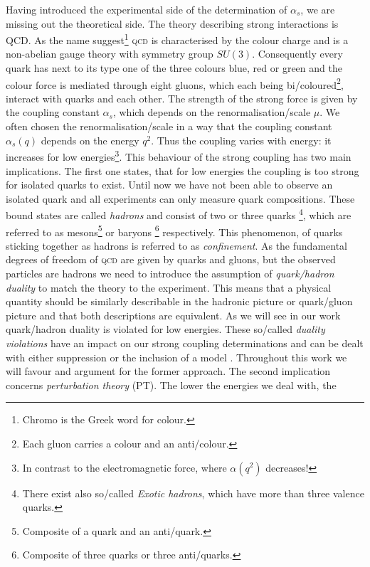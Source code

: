 \documentclass[../../index.tex]{subfiles}
\begin{document}
Having introduced the experimental side of the determination of $\alpha_s$, we
are missing out the theoretical side. The theory describing strong interactions
is \textsc{QCD}. As the name suggest\footnote{Chromo is the Greek word for
  colour.} \textsc{qcd} is characterised by the colour charge and is a
non-abelian gauge theory with symmetry group $SU(3)$. Consequently every quark
has next to its type one of the three colours blue, red or green and the colour
force is mediated through eight gluons, which each being
bi\-/coloured\footnote{Each gluon carries a colour and an anti\-/colour.},
interact with quarks and each other. The strength of the strong force is given
by the coupling constant $\alpha_s$, which depends on the
renormalisation\-/scale $\mu$. We often chosen the renormalisation\-/scale in a
way that the coupling constant $\alpha_s(q)$ depends on the energy $q^2$. Thus
the coupling varies with energy: it increases for low energies\footnote{In
  contrast to the electromagnetic force, where $\alpha(q^2)$ decreases!}. This
behaviour of the strong coupling has two main implications. The first one
states, that for low energies the coupling is too strong for isolated quarks to
exist. Until now we have not been able to observe an isolated quark and all
experiments can only measure quark compositions. These bound states are called
\textit{hadrons} and consist of two or three quarks \footnote{There exist also
  so\-/called \textit{Exotic hadrons}, which have more than three valence
  quarks.}, which are referred to as mesons\footnote{Composite of a quark and an
  anti\-/quark.} or baryons \footnote{Composite of three quarks or three
  anti\-/quarks.} respectively. This phenomenon, of quarks sticking together as
hadrons is referred to as \textit{confinement}. As the fundamental degrees of
freedom of \textsc{qcd} are given by quarks and gluons, but the observed
particles are hadrons we need to introduce the assumption of
\textit{quark\-/hadron duality} to match the theory to the experiment. This
means that a physical quantity should be similarly describable in the hadronic
picture or quark\-/gluon picture and that both descriptions are equivalent. As
we will see in our work quark\-/hadron duality is violated for low energies.
These so\-/called \textit{duality violations} have an impact on our strong
coupling determinations and can be dealt with either suppression or the
inclusion of a model \cite{Pich2006,Cata2008}. Throughout this work we will
favour and argument for the former approach. The second implication concerns
\textit{perturbation theory} (PT). The lower the energies we deal with, the
\end{document}
